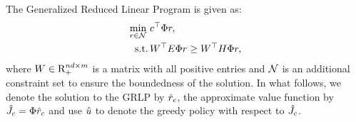 The Generalized Reduced Linear Program is given as:
\begin{align}\label{grlp}
\begin{split}
\underset{r\in \N}{\min}\, &\, c^\top \Phi r,\\
\text{s.t.}\mb & \,W^\top E\Phi r\geq W^\top H \Phi r,
\end{split}
\end{align}
where $W \in \mathrm{R}^{nd\times m}_+$ is a matrix with all positive entries and $\mathcal{N}$ is an additional constraint set to ensure the boundedness of the solution.
In what follows, we denote the solution to the GRLP by $\hat{r}_c$, the approximate value function by $\hat{J}_c=\Phi \hat{r}_c$ and use $\hat{u}$ to denote the greedy policy with respect to $\hat{J}_c$.

